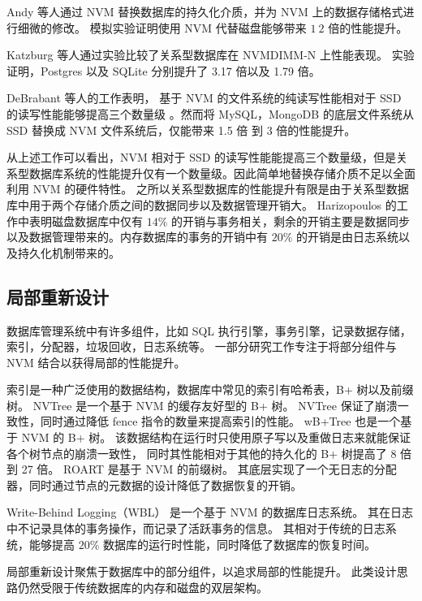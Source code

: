 Andy 等人通过 NVM 替换数据库的持久化介质，并为 NVM 上的数据存储格式进行细微的修改\cite{arulraj_lets_2015}。
模拟实验证明使用 NVM 代替磁盘能够带来 $1~2$ 倍的性能提升。

Katzburg 等人通过实验比较了关系型数据库在 NVMDIMM-N 上性能表现\cite{katzburg_nvdimm-n_2018}。
实验证明，Postgres 以及 SQLite 分别提升了 3.17 倍以及 1.79 倍。

DeBrabant 等人的工作表明，
基于 NVM 的文件系统的纯读写性能相对于 SSD 的读写性能能够提高三个数量级
\cite{debrabant_prolegomenon_2014}。然而将 MySQL，MongoDB 的底层文件系统从 SSD 替换成 NVM 文件系统后，仅能带来 1.5 倍 到 3 倍的性能提升。

从上述工作可以看出，NVM 相对于 SSD 的读写性能能提高三个数量级，但是关系型数据库系统的性能提升仅有一个数量级。因此简单地替换存储介质不足以全面利用 NVM 的硬件特性。
之所以关系型数据库的性能提升有限是由于关系型数据库中用于两个存储介质之间的数据同步以及数据管理开销大。
Harizopoulos 的工作中表明磁盘数据库中仅有 $14\%$ 的开销与事务相关，剩余的开销主要是数据同步以及数据管理带来的\cite{harizopoulos_oltp_2018}。内存数据库的事务的开销中有 $20\%$ 的开销是由日志系统以及持久化机制带来的。


\subsection{局部重新设计}

数据库管理系统中有许多组件，比如 SQL 执行引擎，事务引擎，记录数据存储，索引，分配器，垃圾回收，日志系统等。
一部分研究工作专注于将部分组件与 NVM 结合以获得局部的性能提升。

索引是一种广泛使用的数据结构，数据库中常见的索引有哈希表，B+ 树以及前缀树。
NVTree\cite{nv-tree} 是一个基于 NVM 的缓存友好型的 B+ 树。
NVTree 保证了崩溃一致性，同时通过降低 fence 指令的数量来提高索引的性能。
wB+Tree\cite{chen2015persistent} 也是一个基于 NVM 的 B+ 树。
该数据结构在运行时只使用原子写以及重做日志来就能保证各个树节点的崩溃一致性，
同时其性能相对于其他的持久化的 B+ 树提高了 8 倍到 27 倍。
ROART\cite{ma_roart_2021} 是基于 NVM 的前缀树。
其底层实现了一个无日志的分配器，同时通过节点的元数据的设计降低了数据恢复的开销。

Write-Behind Logging（WBL） 是一个基于 NVM 的数据库日志系统\cite{wbl}。
其在日志中不记录具体的事务操作，而记录了活跃事务的信息。
其相对于传统的日志系统，能够提高 $20\%$ 数据库的运行时性能，同时降低了数据库的恢复时间。

局部重新设计聚焦于数据库中的部分组件，以追求局部的性能提升。
此类设计思路仍然受限于传统数据库的内存和磁盘的双层架构。

